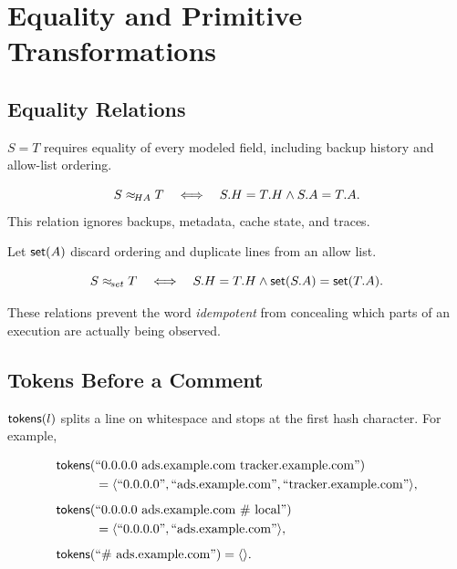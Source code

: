 \section{Equality and Primitive Transformations}

\subsection{Equality Relations}

\begin{definition}
$S=T$ requires equality of every modeled field, including backup history and
allow-list ordering.
\end{definition}

\begin{definition}
\[
  S \mathrel{\approx_{\!HA}} T
  \quad\Longleftrightarrow\quad
  S.H=T.H \land S.A=T.A.
\]
This relation ignores backups, metadata, cache state, and traces.
\end{definition}

Let $\mathsf{set}(A)$ discard ordering and duplicate lines from an allow list.

\begin{definition}
\[
  S \mathrel{\approx_{\!set}} T
  \quad\Longleftrightarrow\quad
  S.H=T.H \land \mathsf{set}(S.A)=\mathsf{set}(T.A).
\]
\end{definition}

These relations prevent the word \emph{idempotent} from concealing which parts
of an execution are actually being observed.

\subsection{Tokens Before a Comment}

$\mathsf{tokens}(l)$ splits a line on whitespace and stops at the first hash character.
For example,

\begin{align*}
\mathsf{tokens}(&\text{``0.0.0.0 ads.example.com tracker.example.com''})\\
  &=\langle\text{``0.0.0.0''},\text{``ads.example.com''},
             \text{``tracker.example.com''}\rangle,\\[0.5em]
\mathsf{tokens}(&\text{``0.0.0.0 ads.example.com \# local''})\\
  &=\langle\text{``0.0.0.0''},\text{``ads.example.com''}\rangle,\\[0.5em]
\mathsf{tokens}(&\text{``\# ads.example.com''})=\langle\rangle.
\end{align*}

